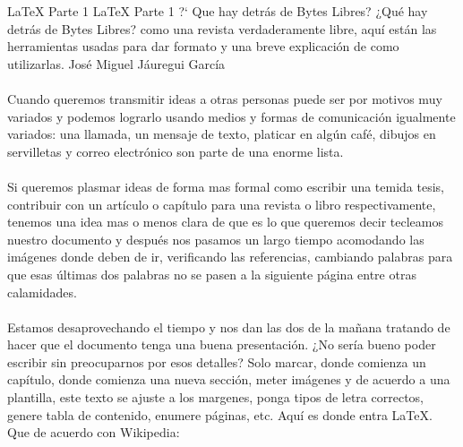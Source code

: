 
\Chapter%
         {\LaTeX{} Parte 1}%
         {\LaTeX{} Parte 1 ?` Que hay detrás de Bytes Libres?}%
         {¿Qué hay detrás de Bytes Libres? como una revista
         verdaderamente libre, aquí están las herramientas usadas
         para dar formato y una breve explicación de como
         utilizarlas.}%
         {José Miguel Jáuregui García}%

\paragraph{}Cuando queremos transmitir ideas a otras personas puede ser por motivos muy variados y podemos lograrlo usando medios y formas de comunicación igualmente variados: una llamada, un mensaje de texto, platicar en algún café, dibujos en servilletas y correo electrónico son parte de una enorme lista.
\paragraph{}Si queremos plasmar ideas de forma mas formal como escribir una temida tesis, contribuir con un artículo o capítulo para una revista o libro respectivamente, tenemos una idea mas o menos clara de que es lo que queremos decir tecleamos nuestro documento y después nos pasamos un largo tiempo acomodando las imágenes donde deben de ir, verificando las referencias, cambiando palabras para que esas últimas dos palabras no se pasen a la siguiente página entre otras calamidades.
\paragraph{}Estamos desaprovechando el tiempo y nos dan las dos de la mañana tratando de hacer que el documento tenga una buena presentación. ¿No sería bueno poder escribir sin preocuparnos por esos detalles? Solo marcar, donde comienza un capítulo, donde comienza una nueva sección, meter imágenes y de acuerdo a una plantilla, este texto se ajuste a los margenes, ponga tipos de letra correctos, genere tabla de contenido, enumere páginas, etc. Aquí es donde entra \LaTeX{}. Que de acuerdo con Wikipedia:

